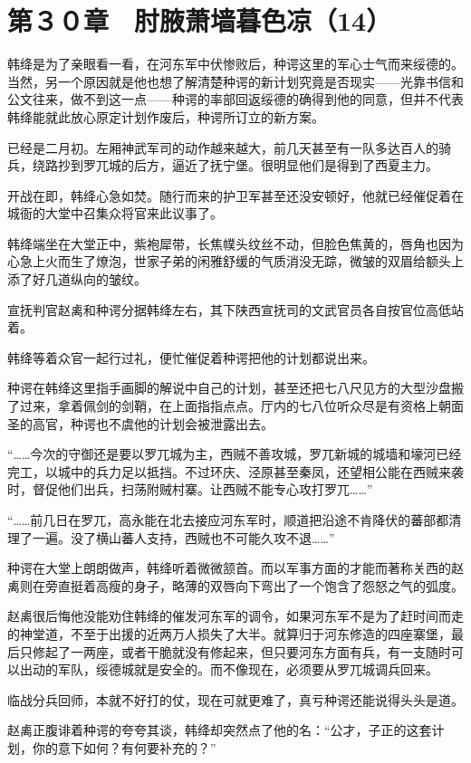 \section{第３０章　肘腋萧墙暮色凉（14）}

韩绛是为了亲眼看一看，在河东军中伏惨败后，种谔这里的军心士气而来绥德的。当然，另一个原因就是他也想了解清楚种谔的新计划究竟是否现实——光靠书信和公文往来，做不到这一点——种谔的率部回返绥德的确得到他的同意，但并不代表韩绛能就此放心原定计划作废后，种谔所订立的新方案。

已经是二月初。左厢神武军司的动作越来越大，前几天甚至有一队多达百人的骑兵，绕路抄到罗兀城的后方，逼近了抚宁堡。很明显他们是得到了西夏主力。

开战在即，韩绛心急如焚。随行而来的护卫军甚至还没安顿好，他就已经催促着在城衙的大堂中召集众将官来此议事了。

韩绛端坐在大堂正中，紫袍犀带，长焦幞头纹丝不动，但脸色焦黄的，唇角也因为心急上火而生了燎泡，世家子弟的闲雅舒缓的气质消没无踪，微皱的双眉给额头上添了好几道纵向的皱纹。

宣抚判官赵禼和种谔分据韩绛左右，其下陕西宣抚司的文武官员各自按官位高低站着。

韩绛等着众官一起行过礼，便忙催促着种谔把他的计划都说出来。

种谔在韩绛这里指手画脚的解说中自己的计划，甚至还把七八尺见方的大型沙盘搬了过来，拿着佩剑的剑鞘，在上面指指点点。厅内的七八位听众尽是有资格上朝面圣的高官，种谔也不虞他的计划会被泄露出去。

“……今次的守御还是要以罗兀城为主，西贼不善攻城，罗兀新城的城墙和壕河已经完工，以城中的兵力足以抵挡。不过环庆、泾原甚至秦凤，还望相公能在西贼来袭时，督促他们出兵，扫荡附贼村寨。让西贼不能专心攻打罗兀……”

“……前几日在罗兀，高永能在北去接应河东军时，顺道把沿途不肯降伏的蕃部都清理了一遍。没了横山蕃人支持，西贼也不可能久攻不退……”

种谔在大堂上朗朗做声，韩绛听着微微颔首。而以军事方面的才能而著称关西的赵禼则在旁直挺着高瘦的身子，略薄的双唇向下弯出了一个饱含了怨怒之气的弧度。

赵禼很后悔他没能劝住韩绛的催发河东军的调令，如果河东军不是为了赶时间而走的神堂道，不至于出援的近两万人损失了大半。就算归于河东修造的四座寨堡，最后只修起了一两座，或者干脆就没有修起来，但只要河东方面有兵，有一支随时可以出动的军队，绥德城就是安全的。而不像现在，必须要从罗兀城调兵回来。

临战分兵回师，本就不好打的仗，现在可就更难了，真亏种谔还能说得头头是道。

赵禼正腹诽着种谔的夸夸其谈，韩绛却突然点了他的名：“公才，子正的这套计划，你的意下如何？有何要补充的？”

